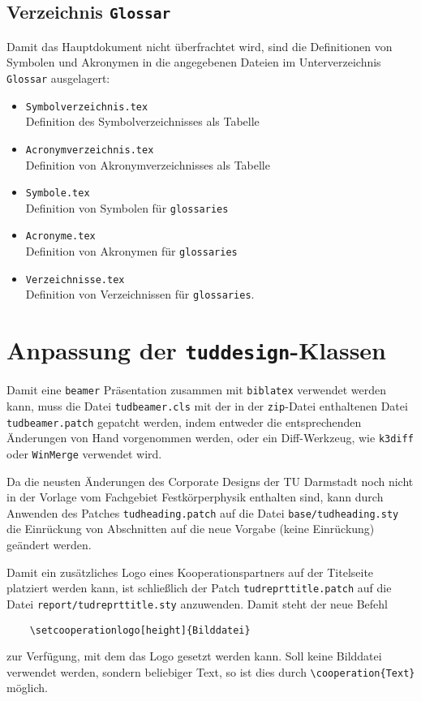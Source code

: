 \subsection{Verzeichnis \texttt{Glossar}}
Damit das Hauptdokument nicht überfrachtet wird, sind die Definitionen von Symbolen und Akronymen in die angegebenen Dateien im Unterverzeichnis \verb|Glossar| ausgelagert:
\begin{itemize}
	\item \verb|Symbolverzeichnis.tex|\\
	Definition des Symbolverzeichnisses als Tabelle
	\item \verb|Acronymverzeichnis.tex|\\
	Definition von Akronymverzeichnisses als Tabelle
	\item \verb|Symbole.tex|\\
	Definition von Symbolen für \texttt{glossaries}
	\item \verb|Acronyme.tex|\\
	Definition von Akronymen für \texttt{glossaries}
	\item \verb|Verzeichnisse.tex|\\
	Definition von Verzeichnissen für \texttt{glossaries}.
\end{itemize}

\section{Anpassung der \texttt{tuddesign}-Klassen}
Damit eine \texttt{beamer} Präsentation zusammen mit \texttt{biblatex} verwendet werden kann, muss die Datei \texttt{tudbeamer.cls} mit der in der \texttt{zip}-Datei enthaltenen Datei \texttt{tudbeamer.patch} gepatcht werden, indem entweder die entsprechenden Änderungen von Hand vorgenommen werden, oder ein Diff-Werkzeug, wie \bspw \texttt{k3diff} oder \texttt{WinMerge} verwendet wird.

Da die neusten Änderungen des Corporate Designs der TU Darmstadt noch nicht in der Vorlage vom Fachgebiet Festkörperphysik enthalten sind, kann durch Anwenden des Patches \texttt{tudheading.patch} auf die Datei \texttt{base/tudheading.sty} die Einrückung von Abschnitten auf die neue Vorgabe (keine Einrückung) geändert werden.

Damit ein zusätzliches Logo eines Kooperationspartners auf der Titelseite platziert werden kann, ist schließlich der Patch \texttt{tudreprt\textunderscore{}title.patch} auf die Datei \texttt{report/tudreprt\textunderscore{}title.sty} anzuwenden.
Damit steht der neue Befehl
\begin{verbatim}
	\setcooperationlogo[height]{Bilddatei}
\end{verbatim}
zur Verfügung, mit dem das Logo gesetzt werden kann.
Soll keine Bilddatei verwendet werden, sondern beliebiger Text, so ist dies durch \verb|\cooperation{Text}| möglich.

